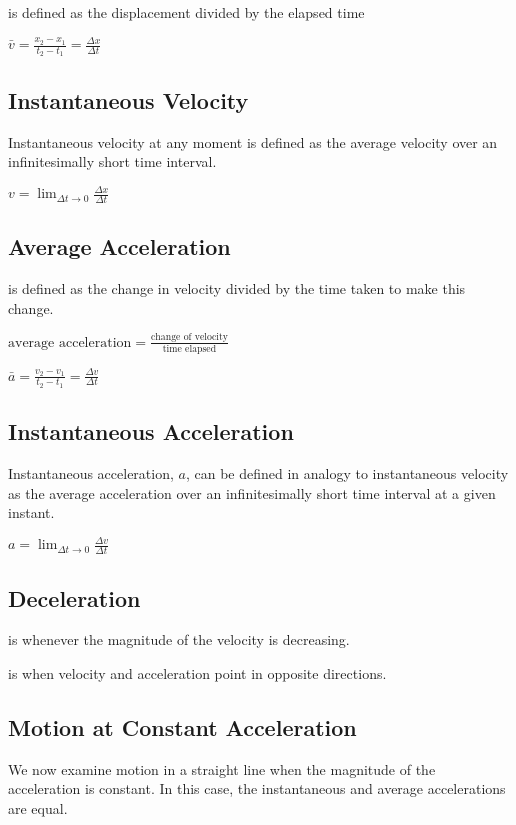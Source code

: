 \documentclass{extarticle}
\begin{document}
is defined as the displacement divided by the elapsed time

$\bar{v} = \frac{x_2 - x_1}{t_2 - t_1} = \frac{\Delta x}{\Delta t}$


\subsection{Instantaneous Velocity}
Instantaneous velocity at any moment is defined as the average velocity over an infinitesimally short time interval.

$v = \lim_{\Delta t \to 0} \frac{\Delta x}{\Delta t}$

\subsection{Average Acceleration}
is defined as the change in velocity divided by the time taken to make this change.

$\text{average acceleration} = \frac{\text{change of velocity}}{\text{time elapsed}}$

$\bar{a} = \frac{v_2 - v_1}{t_2 - t_1} = \frac{\Delta v}{\Delta t}$

\subsection{Instantaneous Acceleration}
Instantaneous acceleration, $a$, can be defined in analogy to instantaneous
velocity as the average acceleration over an infinitesimally short time interval at
a given instant.

$a = \lim_{\Delta t \to 0} \frac{\Delta v}{\Delta t}$



\subsection{Deceleration}
is whenever the magnitude of the velocity is decreasing.

is when velocity and acceleration point in opposite directions.






\markStart[100]


\subsection{Motion at Constant Acceleration}

We now examine motion in a straight line when the magnitude of the acceleration is constant. In this case, the instantaneous and average accelerations are equal.
\end{document}
